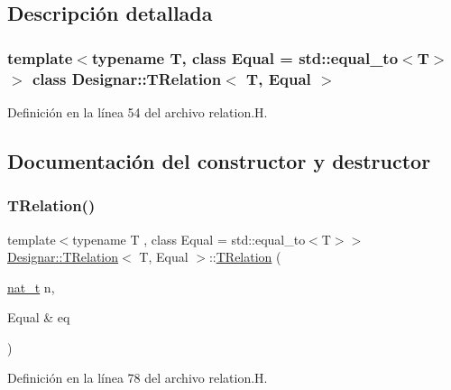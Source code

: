 \subsection{Descripción detallada}
\subsubsection*{template$<$typename T, class Equal = std\+::equal\+\_\+to$<$\+T$>$$>$\newline
class Designar\+::\+T\+Relation$<$ T, Equal $>$}



Definición en la línea 54 del archivo relation.\+H.



\subsection{Documentación del constructor y destructor}
\mbox{\label{class_designar_1_1_t_relation_a1f409c1d5959b2771c31e1f7e92664cf}} 
\subsubsection{\texorpdfstring{T\+Relation()}{TRelation()}\hspace{0.1cm}{\footnotesize\ttfamily [1/4]}}
{\footnotesize\ttfamily template$<$typename T , class Equal  = std\+::equal\+\_\+to$<$\+T$>$$>$ \\
\hyperlink{class_designar_1_1_t_relation}{Designar\+::\+T\+Relation}$<$ T, Equal $>$\+::\hyperlink{class_designar_1_1_t_relation}{T\+Relation} (\begin{DoxyParamCaption}\item[{\hyperlink{namespace_designar_aa72662848b9f4815e7bf31a7cf3e33d1}{nat\+\_\+t}}]{n,  }\item[{Equal \&}]{eq }\end{DoxyParamCaption})\hspace{0.3cm}{\ttfamily [inline]}}



Definición en la línea 78 del archivo relation.\+H.

\mbox{\label{class_designar_1_1_t_relation_ab6e9dc668ef079b565153eb49b45629c}} 
